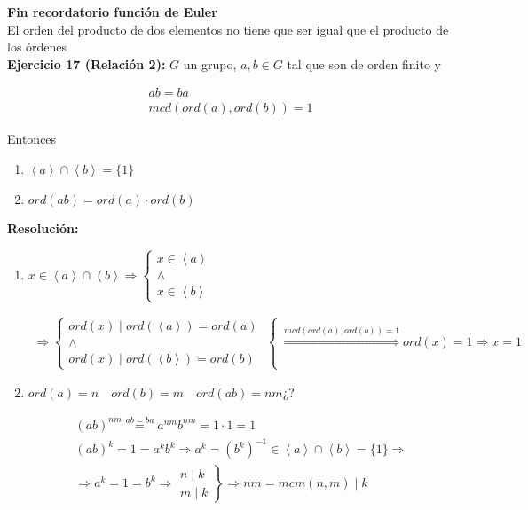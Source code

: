 \documentclass{article}
\begin{document}
\textbf{Fin recordatorio función de Euler} \\

El orden del producto de dos elementos no tiene que ser igual que el producto de los órdenes \\

\textbf{Ejercicio 17 (Relación 2):} $G$ un grupo, $a,b\in G$ tal que son de orden finito y 

\begin{gather*}
ab=ba \\
mcd(ord(a),ord(b))=1
\end{gather*}

Entonces
\begin{enumerate}[(1)]
\item $\left\langle a \right\rangle \cap \left\langle b \right\rangle = \{1\}$
\item $ord(ab)=ord(a)\cdot ord(b)$
\end{enumerate}

\textbf{Resolución:}
\begin{enumerate}[(1)]
\item $x\in \left\langle a \right\rangle \cap \left\langle b \right\rangle \Rightarrow \left\lbrace \begin{array}{c}
x \in \left\langle a\right\rangle \\
\wedge \\
x\in \left\langle b \right\rangle
\end{array} \right.$

\begin{gather*}
\Rightarrow \left\lbrace \begin{array}{c}
ord(x)\mid ord(\left\langle a \right\rangle)=ord(a) \\
\wedge \\
ord(x)\mid ord(\left\langle b \right\rangle)=ord(b)
\end{array} \right\lbrace \overset{mcd(ord(a),ord(b))=1}{\Rightarrow} ord(x)=1 \Rightarrow x=1
\end{gather*}

\item $ord(a)=n \quad ord(b)=m \quad ord(ab)=nm$¿?

\begin{gather*}
(ab)^{nm}\overset{ab=ba}{=}a^{nm}b^{nm}=1\cdot 1=1  \\
(ab)^k=1=a^kb^k\Rightarrow a^k=(b^k)^{-1} \in \left\langle a \right\rangle\cap \left\langle b \right\rangle =\{1\} \Rightarrow \\
\Rightarrow a^k=1=b^k\Rightarrow \left. \begin{array}{c}
n\mid k \\
m\mid k
\end{array} \right\rbrace \Rightarrow nm=mcm(n,m)\mid k
\end{gather*}
\end{enumerate}
\end{document}
